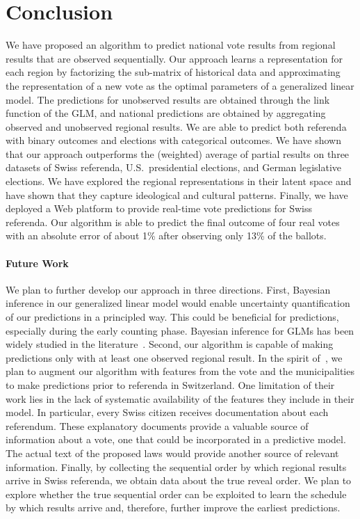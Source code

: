 \section{Conclusion}%
\label{sec:conclusion}

We have proposed an algorithm to predict national vote results from regional results that are observed sequentially.
Our approach learns a representation for each region by factorizing the sub-matrix of historical data and approximating the representation of a new vote as the optimal parameters of a generalized linear model.
The predictions for unobserved results are obtained through the link function of the GLM, and national predictions are obtained by aggregating observed and unobserved regional results.
We are able to predict both referenda with binary outcomes and elections with categorical outcomes.
We have shown that our approach outperforms the (weighted) average of partial results on three datasets of Swiss referenda, U.S.\ presidential elections, and German legislative elections.
We have explored the regional representations in their latent space and have shown that they capture ideological and cultural patterns.
Finally, we have deployed a Web platform to provide real-time vote predictions for Swiss referenda.
Our algorithm is able to predict the final outcome of four real votes with an absolute error of about 1\% after observing only 13\% of the ballots.

\paragraph{Future Work}

We plan to further develop our approach in three directions.
First, Bayesian inference in our generalized linear model would enable uncertainty quantification of our predictions in a principled way.
This could be beneficial for predictions, especially during the early counting phase.
Bayesian inference for GLMs has been widely studied in the literature~\citep{murphy2012machine}.
Second, our algorithm is capable of making predictions only with at least one observed regional result.
In the spirit of~\citet{etter2016online}, we plan to augment our algorithm with features from the vote and the municipalities to make predictions prior to referenda in Switzerland.
One limitation of their work lies in the lack of systematic availability of the features they include in their model.
In particular, every Swiss citizen receives documentation about each referendum.
These explanatory documents provide a valuable source of information about a vote, one that could be incorporated in a predictive model.
The actual text of the proposed laws would provide another source of relevant information.
Finally, by collecting the sequential order by which regional results arrive in Swiss referenda, we obtain data about the true reveal order.
We plan to explore whether the true sequential order can be exploited to learn the schedule by which results arrive and, therefore, further improve the earliest predictions.
